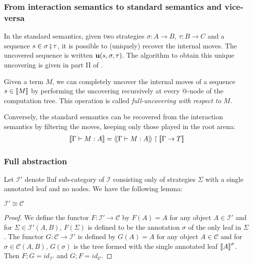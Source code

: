 \subsubsection{From interaction semantics to standard semantics and vice-versa}

In the standard semantics, given two strategies $\sigma : A \rightarrow B$, $\tau : B \rightarrow C$ and
a sequence $s \in \sigma \fatsemi \tau$, it is possible to (uniquely) recover the internal moves. The uncovered sequence is written
${\bf u}(s, \sigma, \tau)$. The algorithm to obtain this unique uncovering is given in part II of \cite{hylandong_pcf}.

Given a term $M$, we can completely uncover the internal moves of a
sequence $s\in{[\![M ]\!]}$ by performing the uncovering recursively at
every @-node of the computation tree. This operation is called
\emph{full-uncovering with respect to $M$}.

Conversely, the standard semantics can be recovered from the
interaction semantics by filtering the moves, keeping only those
played in the root arena:
\begin{eqnarray}
 {[\![\Gamma \vdash M : A ]\!]} = {\langle\!\langle \Gamma \vdash M : A \rangle\!\rangle} \upharpoonright {[\![\Gamma \rightarrow T ]\!]} \label{eqn:int_std_gamsem}
\end{eqnarray}


\subsubsection{Full abstraction}

Let $\mathcal{I'}$ denote lluf sub-category of $\mathcal{I}$
consisting only of strategies $\Sigma$ with a single annotated leaf
and no nodes. We have the following lemma:
\begin{lem}
$\mathcal{I'} \cong \mathcal{C}$
\end{lem}
\begin{proof}
We define the functor $F:\mathcal{I'} \rightarrow \mathcal{C}$
by $F(A) = A$ for any object $A\in \mathcal{I'}$ and for $\Sigma \in \mathcal{I'}(A,B)$,
$F(\Sigma)$ is defined to be the annotation $\sigma$ of the only leaf in $\Sigma$.
The functor $G:\mathcal{C} \rightarrow \mathcal{I'}$ is defined by
$G(A) = A$ for any object $A\in \mathcal{C}$ and for $\sigma \in \mathcal{C}(A,B)$,
$G(\sigma)$ is the tree formed with the single annotated leaf ${[\![ A ]\!]}^\sigma$.
Then $F;G =id_{\mathcal{I'}}$ and $G;F =id_{\mathcal{C}}$.
\end{proof}

